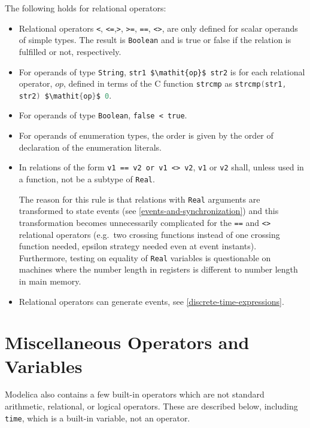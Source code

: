 The following holds for relational operators:
\begin{itemize}
\item
  Relational operators \lstinline!<!, \lstinline!<=!,\lstinline!>!, \lstinline!>=!, \lstinline!==!, \lstinline!<>!, are only defined for scalar operands of simple types.
  The result is \lstinline!Boolean! and is true or false if the relation is fulfilled or not, respectively.
\item
  For operands of type \lstinline!String!, \lstinline!str1 $\mathit{op}$ str2! is for each relational operator, $\mathit{op}$, defined in terms of the C function \lstinline[language=C]!strcmp! as \lstinline[language=C]!strcmp(str1, str2) $\mathit{op}$ 0!.
\item
  For operands of type \lstinline!Boolean!, \lstinline!false < true!.
\item
  For operands of enumeration types, the order is given by the order of declaration of the enumeration literals.
\item
  In relations of the form \lstinline!v1 == v2 or v1 <> v2!, \lstinline!v1! or \lstinline!v2! shall, unless used in a function, not be a subtype of \lstinline!Real!.
  \begin{nonnormative}
  The reason for this rule is that relations with \lstinline!Real! arguments are transformed to state events (see \cref{events-and-synchronization}) and this transformation becomes unnecessarily complicated for the \lstinline!==! and \lstinline!<>! relational operators (e.g.\ two crossing functions instead of one crossing function needed, epsilon strategy needed even at event instants).
  Furthermore, testing on equality of \lstinline!Real! variables is questionable on machines where the number length in registers is different to number length in main memory.
  \end{nonnormative}
\item
  Relational operators can generate events, see \cref{discrete-time-expressions}.
\end{itemize}

\section{Miscellaneous Operators and Variables}\label{miscellaneous-operators-and-variables}

Modelica also contains a few built-in operators which are not standard arithmetic, relational, or logical operators.
These are described below, including \lstinline!time!, which is a built-in variable, not an operator.

